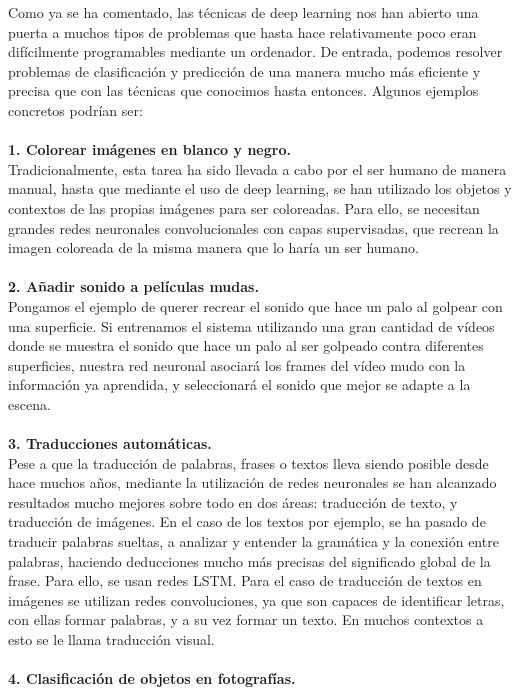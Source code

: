 Como ya se ha comentado, las técnicas de deep learning nos han abierto una puerta a muchos tipos de problemas que hasta hace relativamente poco eran difícilmente programables mediante un ordenador. De entrada, podemos resolver problemas de clasificación y predicción de una manera mucho más eficiente y precisa que con las técnicas que conocimos hasta entonces. Algunos ejemplos concretos podrían ser:\\\\
\textbf{1. Colorear imágenes en blanco y negro.}\\
Tradicionalmente, esta tarea ha sido llevada a cabo por el ser humano de manera manual, hasta que mediante el uso de deep learning, se han utilizado los objetos y contextos de las propias imágenes para ser coloreadas. Para ello, se necesitan grandes redes neuronales convolucionales con capas supervisadas, que recrean la imagen coloreada de la misma manera que lo haría un ser humano.\\
\\\textbf{2. Añadir sonido a películas mudas.}\\
Pongamos el ejemplo de querer recrear el sonido que hace un palo al golpear con una superficie. Si entrenamos el sistema utilizando una gran cantidad de vídeos donde se muestra el sonido que hace un palo al ser golpeado contra diferentes superficies, nuestra red neuronal asociará los frames del vídeo mudo con la información ya aprendida, y seleccionará el sonido que mejor se adapte a la escena.\\
\\\textbf{3. Traducciones automáticas.}\\
Pese a que la traducción de palabras, frases o textos lleva siendo posible desde hace muchos años, mediante la utilización de redes neuronales se han alcanzado resultados mucho mejores sobre todo en dos áreas: traducción de texto, y traducción de imágenes. En el caso de los textos por ejemplo, se ha pasado de traducir palabras sueltas, a analizar y entender la gramática y la conexión entre palabras, haciendo deducciones mucho más precisas del significado global de la frase. Para ello, se usan redes LSTM. Para el caso de traducción de textos en imágenes se utilizan redes convoluciones, ya que son capaces de identificar letras, con ellas formar palabras, y a su vez formar un texto. En muchos contextos a esto se le llama traducción visual.\\
\\\textbf{4. Clasificación de objetos en fotografías.}\\
